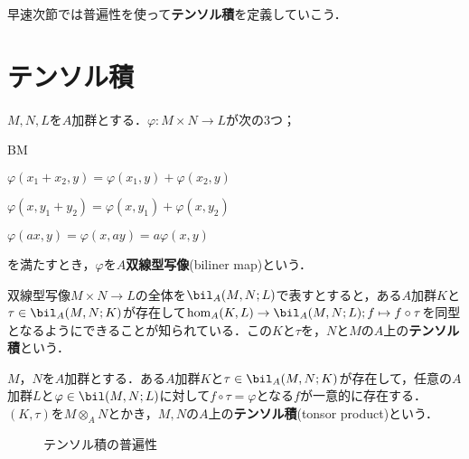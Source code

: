 早速次節では普遍性を使って\textbf{テンソル積}を定義していこう．

\section{テンソル積}

\begin{defi}[双線型写像]
	$M,N,L$を$A$加群とする．$\varphi:M\times N\to L$が次の3つ；
	\begin{defiterm}{BM}
		\item $\varphi(x_1+x_2,y)=\varphi(x_1,y)+\varphi(x_2,y)$
		\item $\varphi(x,y_1+y_2)=\varphi(x,y_1)+\varphi(x,y_2)$
		\item $\varphi(ax,y)=\varphi(x,ay)=a\varphi(x,y)$
	\end{defiterm}
	を満たすとき，$\varphi$を$A$\textbf{双線型写像}(biliner map)という．
\end{defi}

双線型写像$M\times N\to L$の全体を$\bil_A(M,N;L)$で表すとすると，ある$A$加群$K$と$\tau\in\bil_A(M,N;K)$が存在して$\hom_A(K,L)\to\bil_A(M,N;L);f\mapsto f\circ\tau$を同型となるようにできることが知られている．この$K$と$\tau$を，$N$と$M$の$A$上の\textbf{テンソル積}という．

\begin{defi}[テンソル積]
	$M，N$を$A$加群とする．ある$A$加群$K$と$\tau\in\bil_A(M,N;K)$が存在して，任意の$A$加群$L$と$\varphi\in\bil(M,N;L)$に対して$f\circ\tau=\varphi$となる$f$が一意的に存在する．$(K,\tau)$を$M\otimes_A N$とかき，$M,N$の$A$上の\textbf{テンソル積}(tonsor product)という．
\end{defi}

\begin{figure}[H]
	\centering
	\caption{テンソル積の普遍性}
\end{figure}

